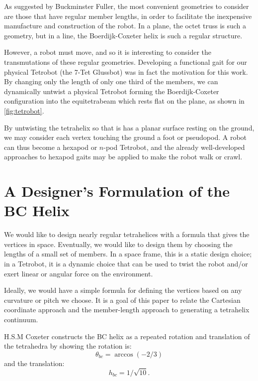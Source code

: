\documentclass[twocolumn,10pt]{asme2ej}
\begin{document}
As suggested by Buckminster Fuller, the most convenient geometries to
consider are those that have regular member lengths, in order to
facilitate the inexpensive manufacture and construction of the robot.
In a plane, the octet truss\cite{richard1961synergetic} is such a geometry, but in a line, the
Boerdijk-Coxeter helix is such a regular structure.

However, a robot must move, and so it is interesting to consider the
transmutations of these regular geometries. Developing a functional
gait for our physical Tetrobot (the 7-Tet Glussbot) was in fact the motivation
for this work.
By changing only the length of only one third of the members,
we can dynamically untwist a physical Tetrobot
forming the Boerdijk-Coxeter configuration into the equitetrabeam which rests flat on the plane,
as shown in \cref{fig:tetrobot}.

By untwisting the tetrahelix so that is has a planar surface resting on the ground,
we may consider each vertex touching the ground a foot or pseudopod. A robot can thus
become a hexapod or $n$-pod Tetrobot, and the already well-developed approaches to
hexapod gaits may be applied to make the robot walk or crawl.


\section{A Designer's Formulation of the BC Helix}

We would like to design nearly regular tetrahelices with a formula that
gives the vertices in space. Eventually, we would like to design them
by choosing the lengths of a small set of members.
In a space frame, this is a static design choice; in a Tetrobot, it is a
dynamic choice that can be used to twist the robot and/or exert linear or
angular force on the environment.

Ideally, we would have a simple formula for defining the vertices based on
any curvature or pitch we choose. It is a goal of
this paper to relate the Cartesian coordinate approach and the member-length approach to
generating a tetrahelix continuum.


H.S.M Coxeter constructs the BC helix\cite{coxeter1985simplicial} as a repeated rotation and
translation of the tetrahedra by showing the
rotation is:
\begin{equation}
\theta_{bc} = \arccos(-2/3) 
\end{equation}
and the translation:
\begin{equation}
h_{bc} = 1/\sqrt{10}.
\end{equation}
\end{document}
